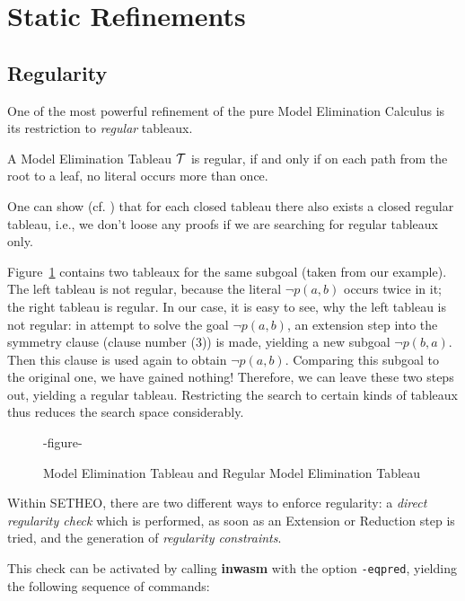 \section{Static Refinements}
\subsection{Regularity}

One of the most powerful refinement of the pure Model Elimination
Calculus is its restriction to {\em regular\/} tableaux.

\begin{definition}
A Model Elimination Tableau $\cal T$ is regular, if and only if on
each path from the root to a leaf, no literal occurs more than once.
\end{definition}

One can show (cf. \cite{LSBB89,LMG94}) that for each closed tableau
there also exists a closed regular tableau, i.e., we don't loose any
proofs if we are searching for regular tableaux only.

Figure~\ref{fig:tut2:reg-tab} contains two tableaux for the same
subgoal (taken from our example). The left tableau is not regular,
because the literal $\neg p(a,b)$ occurs twice in it; the right tableau
is regular. In our case, it is easy to see, why the left tableau is
not regular: in attempt to solve the goal $\neg p(a,b)$, an extension
step into the symmetry clause (clause number (3)) is made, yielding
a new subgoal $\neg p(b,a)$. Then this clause is used again to
obtain $\neg p(a,b)$. Comparing this subgoal to the original one,
we have gained nothing! Therefore, we can leave these two steps out,
yielding a regular tableau. Restricting the search to certain kinds
of tableaux thus reduces the search space considerably.

\begin{figure}[htb]
-figure-
\caption{Model Elimination Tableau and Regular Model Elimination Tableau}
\label{fig:tut2:reg-tab}
\end{figure}

Within SETHEO, there are two different ways to enforce regularity:
a {\em direct regularity check\/} which is performed, as soon as an
Extension or Reduction step is tried, and the generation of {\em
regularity constraints\/}. 

 This check can be
activated by calling {\bf inwasm} with the option {\tt -eqpred},
yielding the following sequence of commands:

